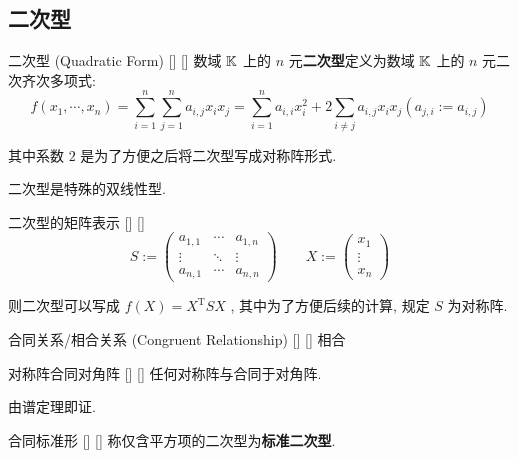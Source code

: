 \documentclass[UTF8]{ctexart}
\DeclareMathOperator{\0}{\mathbf{0}}
\DeclareMathOperator{\<}{\langle}
\renewcommand{\>}{\rangle}
\begin{document}
	\subsection{二次型}
	
		\begin{dfn}
			[]
			{二次型 (Quadratic Form)}
			[]
			[]
			数域  \(\operatorname{\mathbb{K}}\)  上的  \(n\)  元\textbf{二次型}定义为数域  \(\operatorname{\mathbb{K}}\)  上的  \(n\)  元二次齐次多项式: 
                \[ f(x_1,\cdots,x_n)=\sum_{i = 1}^{n} \sum_{j = 1}^{n}a_{i,j}x_i x_j
                = \sum_{i = 1}^n a_{i,i}x_i^2 + 2\sum_{i\neq j} a_{i,j}x_i x_j
			(a_{j,i}:=a_{i,j})\]

                其中系数  \(2\)  是为了方便之后将二次型写成对称阵形式. 
                
                二次型是特殊的双线性型. 
		\end{dfn}

		\begin{ppt}
			[]
			{二次型的矩阵表示}
			[]
			[]
			\[ S:=
                \begin{pmatrix}
		          a_{1,1} & \cdots & a_{1,n}\\
                    \vdots & \ddots & \vdots\\
                    a_{n,1} & \cdots & a_{n,n}
			\end{pmatrix}
                \qquad
                X:=
                \begin{pmatrix}
		          x_1\\
                    \vdots\\
                    x_n
			\end{pmatrix}
			\]
   
			则二次型可以写成  \(f(X)=X^\mathrm{T}SX\) , 其中为了方便后续的计算, 规定  \(S\) 为对称阵. 
		\end{ppt}

		\begin{dfn}
			[]
			{合同关系/相合关系 (Congruent Relationship)}
			[]
			[]
			{}
			{相合}
			{}
			{}
		\end{dfn}

		\begin{ppt}
			[]
			{对称阵合同对角阵}
			[]
			[]
            任何对称阵与合同于对角阵. 
		\end{ppt}

		\begin{prf}
            由谱定理即证. 
        \end{prf}
		
		\begin{dfn}
			[]
			{合同标准形}
			[]
			[]
			称仅含平方项的二次型为\textbf{标准二次型}. 
		\end{dfn}
		
\end{document}
